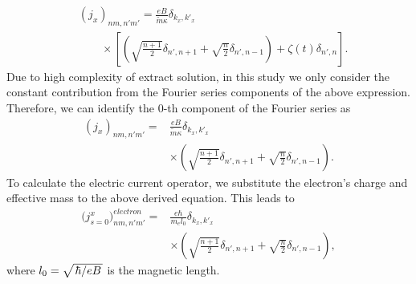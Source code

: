 \documentclass[
 reprint,
 amsmath,amssymb,
 aps,
 prb,
]{revtex4-2}
\begin{document}
{\begin{equation}
  \begin{aligned}
    &\left({j}_x \right)_{nm,n'm'} =
    \frac{eB}{{\widetilde{m}}\kappa}
    \delta_{k_x,k'_x} \\
    & \qquad\times
    \left[
    \left(\sqrt{\frac{n+1}{2}} \delta_{n',n+1} + \sqrt{\frac{n}{2}}
    \delta_{n',n-1}\right)
    + \zeta(t) \delta_{n',n}
    \right].
  \end{aligned}
\end{equation}
Due to high complexity of extract solution, in this study we only consider the constant contribution from the Fourier series components of the above expression. Therefore, we can identify the $0$-th component of the Fourier series as
\begin{equation} \label{eq:d11}
  \begin{aligned}
      \left({j}_x \right)_{nm,n'm'} =&
      \frac{eB}{\widetilde{m}\kappa}
      \delta_{k_x,k'_x} \\
      & \times
      \left(\sqrt{\frac{n+1}{2}} \delta_{n',n+1} + \sqrt{\frac{n}{2}}
      \delta_{n',n-1} \right).
  \end{aligned}
\end{equation}
To calculate the electric current operator, we substitute the electron’s charge and effective mass to the above derived equation. This leads to
\begin{equation} \label{eq:d12}
  \begin{aligned}
      \Big({j}^x_{s=0}\Big)_{nm,n'm'}^{electron}  =&
      \frac{e\hbar}{{m_e}l_0}
      \delta_{k_x,k'_x}\\
      & \times
      \left(\sqrt{\frac{n+1}{2}} \delta_{n',n+1} + \sqrt{\frac{n}{2}}
      \delta_{n',n-1} \right),
  \end{aligned}
\end{equation}
where $l_0 = \sqrt{\flatfrac{\hbar}{eB}}$ is the magnetic length.

}
\end{document}
